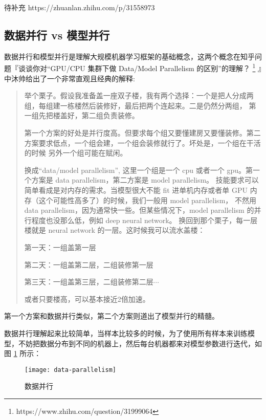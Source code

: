 \begin{newnote}
待补充 https://zhuanlan.zhihu.com/p/31558973
\end{newnote}

\subsection{数据并行 vs 模型并行}\label{subsec:data-vs-model}

数据并行和模型并行是理解大规模机器学习框架的基础概念，这两个概念在知乎问题『谈谈你对“GPU/CPU 集群下做 Data/Model Parallelism 的区别”的理解？%
\footnote{https://www.zhihu.com/question/31999064}%
』中沐帅给出了一个非常直观且经典的解释:
\begin{quotation}
举个栗子。假设我准备盖一座双子楼，我有两个选择：一个是把人分成两组，每组建一栋楼然后装修好，最后把两个连起来。二是仍然分两组，
第一组先把楼盖好，第二组负责装修。

第一个方案的好处是并行度高。但要求每个组又要懂建房又要懂装修。第二方案要求低点，一个组会建，一个组会装修就行了。坏处是，一个组在干活的时候
另外一个组可能在赋闲。

换成“data/model parallelism”, 这里一个组是一个 cpu 或者一个 gpu。第一个方案是 data parallelism，第二方案是 model parallelism。
技能要求可以简单看成是对内存的需求。当模型很大不能 fit 进单机内存或者单 GPU 内存（这个可能性高多了）的时候，我们一般用 model parallelism，
不然用 data parallelism，因为通常快一些。但某些情况下，model parallelism 的并行程度也没那么低，例如 deep neural network。
换回到那个栗子，每一层楼就是 neural network 的一层。这时候我可以流水盖楼：

第一天：一组盖第一层

第二天：一组盖第二层，二组装修第一层

第三天：一组盖第三层，二组装修第二层$\cdots$

或者只要楼高，可以基本接近2倍加速。
\end{quotation}
第一个方案和数据并行类似，第二个方案则道出了模型并行的精髓。

数据并行理解起来比较简单，当样本比较多的时候，为了使用所有样本来训练模型，不妨把数据分布到不同的机器上，然后每台机器都来对模型参数进行迭代，如图
\ref{fig:data-parallelism} 所示：

\begin{figure}[!hbtp]
\centering
\texttt{[image: data-parallelism]}
\caption{数据并行}
\label{fig:data-parallelism}
\end{figure}

